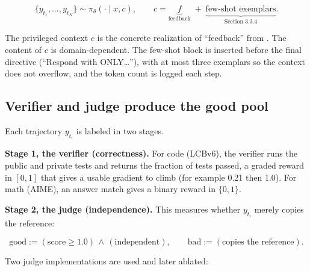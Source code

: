 \[
\{y_{t_1}, \dots, y_{t_N}\} \sim \pi_\theta(\cdot \mid x, c), \qquad c = \underbrace{f}_{\text{feedback}} \;+\; \underbrace{\text{few-shot exemplars}}_{\text{Section~3.3.4}}.
\]

The privileged context \(c\) is the concrete realization of ``feedback'' from \cite{r1}. The content of \(c\) is domain-dependent. The few-shot block is inserted before the final directive (``Respond with ONLY\ldots{}''), with at most three exemplars so the context does not overflow, and the token count is logged each step.

\subsection{Verifier and judge produce the good pool}\label{verifier-and-judge-produce-the-good-pool}

Each trajectory \(y_{t_i}\) is labeled in two stages.

\textbf{Stage 1, the verifier (correctness).} For code (LCBv6), the verifier runs the public and private tests and returns the fraction of tests passed, a graded reward in \([0,1]\) that gives a usable gradient to climb (for example 0.21 then 1.0). For math (AIME), an answer match gives a binary reward in \(\{0,1\}\).

\textbf{Stage 2, the judge (independence).} This measures whether \(y_{t_i}\) merely copies the reference:

\[
\text{good} := (\text{score} \ge 1.0) \,\wedge\, (\text{independent}), \qquad \text{bad} := (\text{copies the reference}).
\]

Two judge implementations are used and later ablated:

